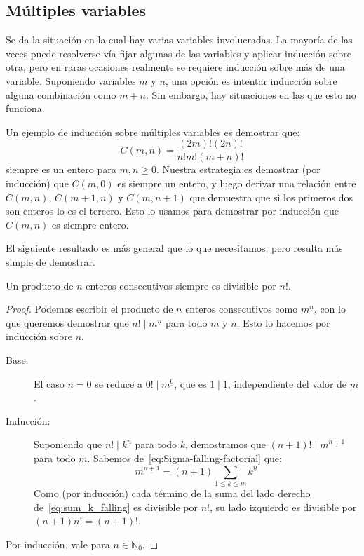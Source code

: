 \subsection{Múltiples variables}
\label{sec:induccion-multiple}

  Se da la situación en la cual hay varias variables involucradas.
  La mayoría de las veces
  puede resolverse vía fijar algunas de las variables
  y aplicar inducción sobre otra,
  pero en raras ocasiones
  realmente se requiere inducción sobre más de una variable.
  Suponiendo variables \(m\) y \(n\),
  una opción es intentar inducción sobre alguna combinación
  como \(m + n\).
  Sin embargo,
  hay situaciones en las que esto no funciona.

  Un ejemplo de inducción sobre múltiples variables
  es demostrar que:
  \begin{equation}
    \label{eq:def-Cmn}
    C(m, n)
      = \frac{(2 m)! (2 n)!}{n! m! (m + n)!}
  \end{equation}
  siempre es un entero para \(m, n \ge 0\).
  Nuestra estrategia es demostrar
  (por inducción)
  que \(C(m, 0)\) es siempre un entero,
  y luego derivar una relación entre \(C(m, n)\), \(C(m + 1, n)\)
  y \(C(m, n + 1)\) que demuestra
  que si los primeros dos son enteros
  lo es el tercero.
  Esto lo usamos para demostrar por inducción
  que \(C(m, n)\) es siempre entero.

  El siguiente resultado es más general que lo que necesitamos,
  pero resulta más simple de demostrar.
  \begin{theorem}
    Un producto de \(n\) enteros consecutivos
    siempre es divisible por \(n!\).
  \end{theorem}
  \begin{proof}
    Podemos escribir el producto de \(n\) enteros consecutivos
    como \(m^{\underline{n}}\),
    con lo que queremos demostrar que \(n! \mid m^{\underline{n}}\)
    para todo \(m\) y \(n\).
    Esto lo hacemos por inducción sobre \(n\).
    \begin{description}
    \item[Base:]
      El caso \(n = 0\)
      se reduce a \(0! \mid m^{\underline{0}}\),
      que es \(1 \mid 1\),
      independiente del valor de \(m\).
    \item[Inducción:]
      Suponiendo que \(n! \mid k^{\underline{n}}\) para todo \(k\),
      demostramos que \((n + 1)! \mid m^{\underline{n + 1}}\)
      para todo \(m\).
      Sabemos de~\eqref{eq:Sigma-falling-factorial} que:
      \begin{equation}
	\label{eq:sum_k_falling}
	m^{\underline{n + 1}}
	  = (n + 1) \sum_{1 \le k \le m} k^{\underline{n}}
      \end{equation}
      Como (por inducción) cada término de la suma del lado derecho
      de~\eqref{eq:sum_k_falling} es divisible por \(n!\),
      su lado izquierdo es divisible por \((n + 1) n! = (n + 1)!\).
    \end{description}
    Por inducción,
    vale para \(n \in \mathbb{N}_0\).
  \end{proof}

